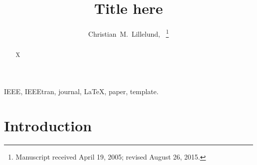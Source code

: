 \documentclass[journal]{IEEEtran}
\begin{document}

\title{Title here}


\author{Christian~M.~Lillelund,~%
\thanks{Manuscript received April 19, 2005; revised August 26, 2015.}}
\maketitle



\begin{abstract}
X
\end{abstract}

\begin{IEEEkeywords}
	IEEE, IEEEtran, journal, \LaTeX, paper, template.
\end{IEEEkeywords}

\section{Introduction}














\end{document}
